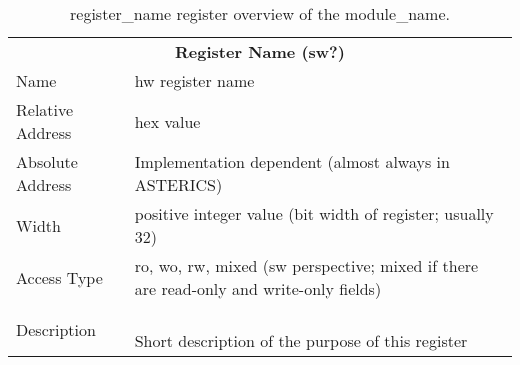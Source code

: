 


\begin{longtable}[ht]{ll}
    \multicolumn{2}{c}{\textbf{Register Name (sw?)}}
    \ \\
    
    Name & hw register name\\
    
    Relative Address & hex value\\
    
    Absolute Address & Implementation dependent (almost always in ASTERICS)\\
    
    Width & positive integer value (bit width of register; usually 32)\\
    
    Access Type & ro, wo, rw, mixed (sw perspective; mixed if there are read-only and write-only fields)\\
    
    Description & \parbox{10cm}{\ \\
        Short description of the purpose of this register\\
    }\\
    \caption{register\_name register overview of the module\_name.}
    \label{table:appropriate-label}
    
\end{longtable}



